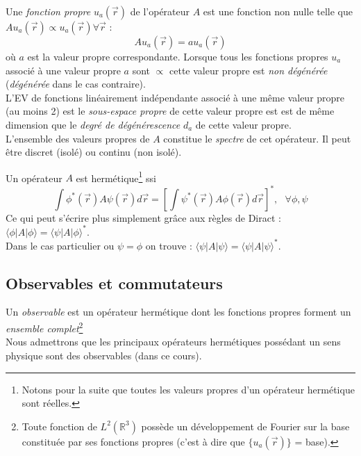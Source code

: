 \documentclass	[11pt, a4paper, openany]{book}
\begin{document}
	Une \textit{fonction propre} $u_a(\vec{r})$ de l'opérateur $A$ est une fonction non nulle telle que $Au_a(\vec{r}) \propto u_a(\vec{r}) \forall \vec{r}$ :
	\begin{equation}
		Au_a(\vec{r}) = au_a(\vec{r})
	\end{equation}
	où $a$ est la valeur propre correspondante. Lorsque tous les fonctions propres $u_a$ associé à une valeur propre $a$ sont $\propto$ cette valeur propre est \textit{non dégénérée} (\textit{dégénérée} dans le cas contraire).\\
	L'EV de fonctions linéairement indépendante associé à une même valeur propre (au moins 2) est le \textit{sous-espace propre} de cette valeur propre est est de même dimension que le \textit{degré de dégénérescence} $d_a$ de cette valeur propre.\\
	
	L'ensemble des valeurs propres de $A$ constitue le \textit{spectre} de cet opérateur. Il peut être discret (isolé) ou continu (non isolé).
	 
	Un opérateur $A$ est  hermétique\footnote{Notons pour la suite que toutes les valeurs propres d'un opérateur hermétique sont réelles.} ssi
	\begin{equation}
		\int \phi^*(\vec{r})A\psi(\vec{r})d\vec{r} = \left[ \int\psi^*(\vec{r})A\phi(\vec{r})d\vec{r} \right]^*, \ \ \ \forall \phi, \psi
	\end{equation}
	Ce qui peut s'écrire plus simplement grâce aux règles de Diract : $\langle \phi|A|\phi \rangle = \langle\psi|A|\phi\rangle^*$.\\
	Dans le cas particulier ou $\psi =  \phi$ on trouve : $\langle\psi|A|\psi\rangle = \langle\psi|A|\psi\rangle^*$.
	
	\subsection*{Observables et commutateurs}
	Un \textit{observable} est un opérateur hermétique dont les fonctions propres forment un \textit{ensemble complet}\footnote{Toute fonction de $L^2(\mathbb{R}^3)$ possède un développement de Fourier sur la base constituée par ses fonctions propres (c'est à dire que $\{u_a(\vec{r})\}$ = base).}\\
	Nous admettrons que les principaux opérateurs hermétiques possédant un sens physique sont des observables (dans ce cours).\\
	
\end{document}
